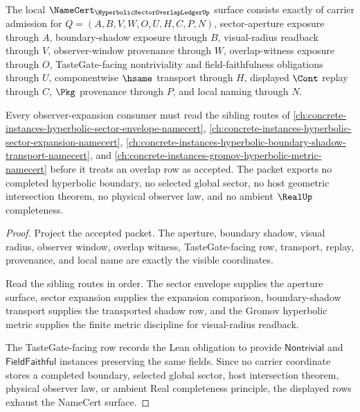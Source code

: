 \begin{theorem}
\label{thm:hyperbolic-sector-overlap-ledger-namecert}
The local $\NameCert_{\HyperbolicSectorOverlapLedgerUp}$ surface consists exactly of carrier admission for $Q=(A,B,V,W,O,U,H,C,P,N)$, sector-aperture exposure through $A$, boundary-shadow exposure through $B$, visual-radius readback through $V$, observer-window provenance through $W$, overlap-witness exposure through $O$, TasteGate-facing nontriviality and field-faithfulness obligations through $U$, componentwise $\hsame$ transport through $H$, displayed $\Cont$ replay through $C$, $\Pkg$ provenance through $P$, and local naming through $N$.

Every observer-expansion consumer must read the sibling routes of \autoref{ch:concrete-instances-hyperbolic-sector-envelope-namecert}, \autoref{ch:concrete-instances-hyperbolic-sector-expansion-namecert}, \autoref{ch:concrete-instances-hyperbolic-boundary-shadow-transport-namecert}, and \autoref{ch:concrete-instances-gromov-hyperbolic-metric-namecert} before it treats an overlap row as accepted. The packet exports no completed hyperbolic boundary, no selected global sector, no host geometric intersection theorem, no physical observer law, and no ambient $\RealUp$ completeness.
\end{theorem}
\begin{proof}
Project the accepted packet. The aperture, boundary shadow, visual radius, observer window, overlap witness, TasteGate-facing row, transport, replay, provenance, and local name are exactly the visible coordinates.

Read the sibling routes in order. The sector envelope supplies the aperture surface, sector expansion supplies the expansion comparison, boundary-shadow transport supplies the transported shadow row, and the Gromov hyperbolic metric supplies the finite metric discipline for visual-radius readback.

The TasteGate-facing row records the Lean obligation to provide $\mathsf{Nontrivial}$ and $\mathsf{FieldFaithful}$ instances preserving the same fields. Since no carrier coordinate stores a completed boundary, selected global sector, host intersection theorem, physical observer law, or ambient Real completeness principle, the displayed rows exhaust the NameCert surface.
\end{proof}

